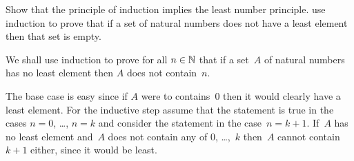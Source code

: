 \documentclass{ibl}  %
\begin{document}
\begin{ex}
Show that the principle of induction implies the least number 
principle.
\hint
use induction to prove that if a set of natural numbers does not
have a least element then that set is empty.
\begin{ans}
We shall use induction to prove for all $n\in\mathbb{N}$ that if a set~$A$ 
of natural numbers has no
least element then $A$ does not contain~$n$.

The base case is easy since if $A$ were to contains~$0$ then it would
clearly have a least element.
For the inductive step assume that the statement is true in the cases
$n=0$, \ldots, $n=k$ and consider the statement in the case~$n=k+1$.
If~$A$ has no least element and~$A$ does not contain any of $0$, \ldots,~$k$ 
then~$A$ cannot contain~$k+1$ either, since it would be least.   
\end{ans}
\end{ex}





\end{document}
